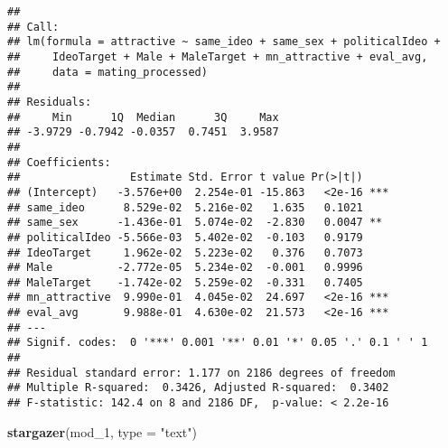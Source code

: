 \documentclass[]{article}
\newenvironment{Shaded}{\begin{snugshade}}{\end{snugshade}}
\newcommand{\KeywordTok}[1]{\textcolor[rgb]{0.13,0.29,0.53}{\textbf{#1}}}
\newcommand{\DataTypeTok}[1]{\textcolor[rgb]{0.13,0.29,0.53}{#1}}
\newcommand{\DecValTok}[1]{\textcolor[rgb]{0.00,0.00,0.81}{#1}}
\newcommand{\StringTok}[1]{\textcolor[rgb]{0.31,0.60,0.02}{#1}}
\newcommand{\NormalTok}[1]{#1}
\begin{document}
\begin{verbatim}
## 
## Call:
## lm(formula = attractive ~ same_ideo + same_sex + politicalIdeo + 
##     IdeoTarget + Male + MaleTarget + mn_attractive + eval_avg, 
##     data = mating_processed)
## 
## Residuals:
##     Min      1Q  Median      3Q     Max 
## -3.9729 -0.7942 -0.0357  0.7451  3.9587 
## 
## Coefficients:
##                 Estimate Std. Error t value Pr(>|t|)    
## (Intercept)   -3.576e+00  2.254e-01 -15.863   <2e-16 ***
## same_ideo      8.529e-02  5.216e-02   1.635   0.1021    
## same_sex      -1.436e-01  5.074e-02  -2.830   0.0047 ** 
## politicalIdeo -5.566e-03  5.402e-02  -0.103   0.9179    
## IdeoTarget     1.962e-02  5.223e-02   0.376   0.7073    
## Male          -2.772e-05  5.234e-02  -0.001   0.9996    
## MaleTarget    -1.742e-02  5.259e-02  -0.331   0.7405    
## mn_attractive  9.990e-01  4.045e-02  24.697   <2e-16 ***
## eval_avg       9.988e-01  4.630e-02  21.573   <2e-16 ***
## ---
## Signif. codes:  0 '***' 0.001 '**' 0.01 '*' 0.05 '.' 0.1 ' ' 1
## 
## Residual standard error: 1.177 on 2186 degrees of freedom
## Multiple R-squared:  0.3426, Adjusted R-squared:  0.3402 
## F-statistic: 142.4 on 8 and 2186 DF,  p-value: < 2.2e-16
\end{verbatim}

\begin{Shaded}
\begin{Highlighting}[]
\KeywordTok{stargazer}\NormalTok{(mod_}\DecValTok{1}\NormalTok{, }\DataTypeTok{type =} \StringTok{"text"}\NormalTok{)}
\end{Highlighting}
\end{Shaded}
\end{document}
